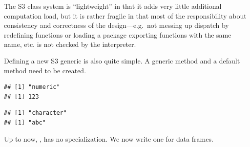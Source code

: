 \documentclass[krantz2]{krantz}\usepackage{knitr}%
\begin{document}
\begin{explainbox}
 The S3 class system is ``lightweight'' in that it adds very little additional computation load, but it is rather fragile in that most of the responsibility about consistency and correctness of the design---e.g.\ not messing up dispatch by redefining functions or loading a package exporting functions with the same name, etc. is not checked by the \Rlang interpreter.

Defining a new S3 generic is also quite simple. A generic method and a default method need to be created.

\begin{knitrout}\footnotesize
{}\color{fgcolor}\begin{kframe}
\begin{alltt}
 \hlkwb{<-}  \hlstd{(}\hlstd{,} \hlstd{) \{}
   \hlstd{(}
 \hlstd{\}}

 \hlkwb{<-} \hlstd{(}\hlstd{,} \hlstd{) \{}
   \hlstd{(}
\hlstd{\}}
\end{alltt}
\end{kframe}
\end{knitrout}

\begin{knitrout}\footnotesize
{}\color{fgcolor}\begin{kframe}
\begin{alltt}
\hlstd{(}\hlstd{)}
\end{alltt}
\begin{verbatim}
## [1] "numeric"
## [1] 123
\end{verbatim}
\begin{alltt}
\hlstd{(}\hlstd{)}
\end{alltt}
\begin{verbatim}
## [1] "character"
## [1] "abc"
\end{verbatim}
\end{kframe}
\end{knitrout}

Up to now, , has no specialization. We now write one for data frames.

\begin{knitrout}\footnotesize
{}\color{fgcolor}\begin{kframe}
\begin{alltt}
 \hlkwb{<-} \hlstd{(}\hlstd{,}  \hlstd{=} \hlopt{:}\hlstd{,} \hlstd{) \{}
\hlstd{\}}
\end{alltt}
\end{kframe}
\end{knitrout}


\end{explainbox}
\end{document}
